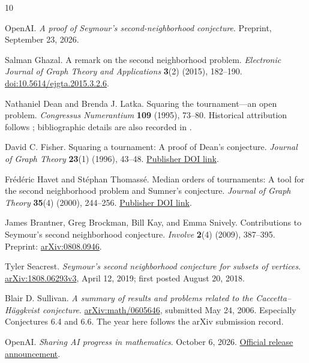 \documentclass[11pt]{article}
\begin{document}
\begin{thebibliography}{10}

OpenAI.
\emph{A proof of Seymour's second-neighborhood conjecture}.
Preprint, September 23, 2026.

Salman Ghazal.
A remark on the second neighborhood problem.
\emph{Electronic Journal of Graph Theory and Applications}
\textbf{3}(2) (2015), 182--190.
\href{https://doi.org/10.5614/ejgta.2015.3.2.6}{doi:10.5614/ejgta.2015.3.2.6}.

Nathaniel Dean and Brenda J. Latka.
Squaring the tournament---an open problem.
\emph{Congressus Numerantium} \textbf{109} (1995), 73--80.
Historical attribution follows \cite{openai}; bibliographic details
are also recorded in \cite{fisher}.

David C. Fisher.
Squaring a tournament: A proof of Dean's conjecture.
\emph{Journal of Graph Theory} \textbf{23}(1) (1996), 43--48.
\href{https://doi.org/10.1002/(SICI)1097-0118(199609)23:1<43::AID-JGT4>3.0.CO;2-K}{Publisher DOI link}.

Fr\'ed\'eric Havet and St\'ephan Thomass\'e.
Median orders of tournaments: A tool for the second neighborhood
problem and Sumner's conjecture.
\emph{Journal of Graph Theory} \textbf{35}(4) (2000), 244--256.
\href{https://doi.org/10.1002/1097-0118(200012)35:4<244::AID-JGT2>3.0.CO;2-H}{Publisher DOI link}.

James Brantner, Greg Brockman, Bill Kay, and Emma Snively.
Contributions to Seymour's second neighborhood conjecture.
\emph{Involve} \textbf{2}(4) (2009), 387--395.
Preprint: \href{https://arxiv.org/abs/0808.0946}{arXiv:0808.0946}.

Tyler Seacrest.
\emph{Seymour's second neighborhood conjecture for subsets of vertices}.
\href{https://arxiv.org/abs/1808.06293v3}{arXiv:1808.06293v3},
April 12, 2019; first posted August 20, 2018.

Blair D. Sullivan.
\emph{A summary of results and problems related to the
Caccetta--H\"aggkvist conjecture}.
\href{https://arxiv.org/abs/math/0605646}{arXiv:math/0605646},
submitted May 24, 2006. Especially Conjectures 6.4 and 6.6.
The year here follows the arXiv submission record.

OpenAI.
\emph{Sharing AI progress in mathematics}.
October 6, 2026.
\href{https://openai.com/index/sharing-ai-progress-in-mathematics/}{Official release announcement}.

\end{thebibliography}
\end{document}

